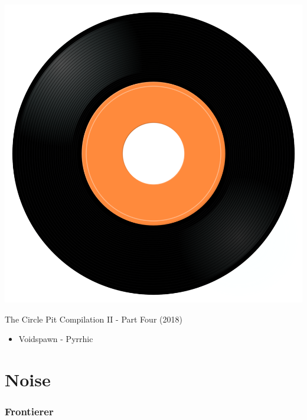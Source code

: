 \begin{minipage}[t]{0.25\textwidth}\vspace{0pt}
\captionsetup{type=figure}
\includegraphics[width=\textwidth]{Images/cover.png}
\caption*{The Circle Pit Compilation II - Part Four (2018)}
\end{minipage}
\begin{minipage}[t]{0.25\textwidth}\vspace{0pt}
\begin{itemize}[nosep,leftmargin=1em,labelwidth=*,align=left]
	\setlength{\itemsep}{0pt}
	\item Voidspawn - Pyrrhic
\end{itemize}
\end{minipage}


\section{Noise}

\subsubsection{Frontierer}

